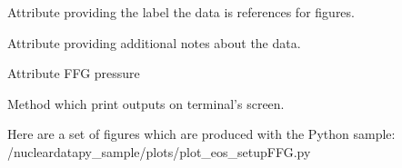 \documentclass[letterpaper,10pt,english]{sphinxmanual}
\begin{document}
\begin{fulllineitems}
\begin{fulllineitems}
\label{\detokenize{source/api/setup_eos_ffg:nucleardatapy.eos.setup_ffg.setupFFG.label}}
\pysigstartsignatures
{}
\pysigstopsignatures
\sphinxAtStartPar
Attribute providing the label the data is references for figures.

\end{fulllineitems}


\begin{fulllineitems}
\label{\detokenize{source/api/setup_eos_ffg:nucleardatapy.eos.setup_ffg.setupFFG.note}}
\pysigstartsignatures
{}
\pysigstopsignatures
\sphinxAtStartPar
Attribute providing additional notes about the data.

\end{fulllineitems}


\begin{fulllineitems}
\label{\detokenize{source/api/setup_eos_ffg:nucleardatapy.eos.setup_ffg.setupFFG.pre_nr}}
\pysigstartsignatures
{}
\pysigstopsignatures
\sphinxAtStartPar
Attribute FFG pressure

\end{fulllineitems}


\begin{fulllineitems}
\label{\detokenize{source/api/setup_eos_ffg:nucleardatapy.eos.setup_ffg.setupFFG.print_outputs}}
\pysigstartsignatures
{}
\pysigstopsignatures
\sphinxAtStartPar
Method which print outputs on terminal’s screen.

\end{fulllineitems}


\end{fulllineitems}


\sphinxAtStartPar
Here are a set of figures which are produced with the Python sample: /nucleardatapy\_sample/plots/plot\_eos\_setupFFG.py
\end{document}
